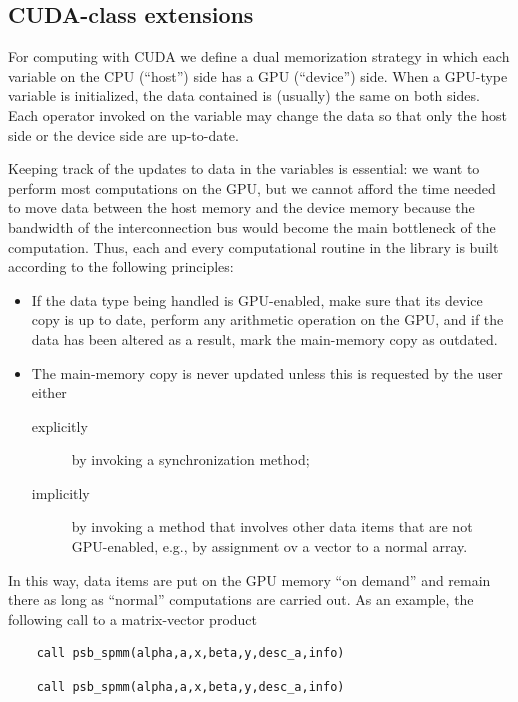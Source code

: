 
\subsection{CUDA-class extensions}
\label{sec:cudastruct}
For computing  with CUDA we define a dual memorization strategy in
which each variable on the CPU (``host'') side has a GPU (``device'')
side. When a GPU-type variable is initialized, the data contained is
(usually) the same on both sides. Each operator invoked on the
variable may change the data so that only the host side or the device
side are up-to-date. 

Keeping track of the updates to data in the variables  is essential: we want
to perform most  computations on the GPU, but we cannot afford the time
needed to move data between the host  memory and the device memory
because the bandwidth of the interconnection bus would become the main
bottleneck of the computation. Thus, each and every computational
routine in the library is built according to the following principles: 
\begin{itemize}
\item If the data type being handled is {GPU}-enabled, make sure that
  its device copy is up to date, perform any arithmetic operation on
  the {GPU}, and if the data has been altered as a result, mark
  the main-memory copy as outdated.
\item The main-memory copy is never updated unless this is requested
  by the user either 
\begin{description}
\item[explicitly] by invoking a synchronization method;
\item[implicitly] by invoking a method that involves other data items
  that are not {GPU}-enabled, e.g., by assignment ov a vector to a
  normal array. 
\end{description}
\end{itemize}
In this way, data items are put on the {GPU} memory ``on demand'' and
remain there as long as ``normal'' computations are carried out. 
As an example, the following call to a matrix-vector product
\ifpdf
\begin{verbatim}
    call psb_spmm(alpha,a,x,beta,y,desc_a,info)
\end{verbatim}
\else
\begin{center}
    \begin{minipage}[tl]{0.9\textwidth}
\begin{verbatim} 
    call psb_spmm(alpha,a,x,beta,y,desc_a,info)
\end{verbatim}
    \end{minipage}
  \end{center}

